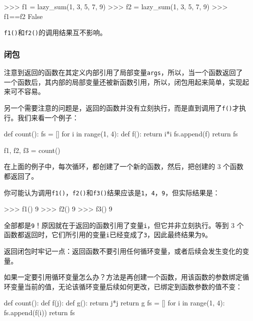 \begin{pythoncode}
>>> f1 = lazy_sum(1, 3, 5, 7, 9)
>>> f2 = lazy_sum(1, 3, 5, 7, 9)
>>> f1==f2
False
\end{pythoncode}

\texttt{f1()}和\texttt{f2()}的调用结果互不影响。

\hypertarget{ux95edux5305}{%
\subsubsection{闭包}\label{ux95edux5305}}

注意到返回的函数在其定义内部引用了局部变量\texttt{args}，所以，当一个函数返回了一个函数后，其内部的局部变量还被新函数引用，所以，闭包用起来简单，实现起来可不容易。

另一个需要注意的问题是，返回的函数并没有立刻执行，而是直到调用了\texttt{f()}才执行。我们来看一个例子：

\begin{pythoncode}
def count():
    fs = []
    for i in range(1, 4):
        def f():
             return i*i
        fs.append(f)
    return fs

f1, f2, f3 = count()
\end{pythoncode}

在上面的例子中，每次循环，都创建了一个新的函数，然后，把创建的 3
个函数都返回了。

你可能认为调用\texttt{f1()}，\texttt{f2()}和\texttt{f3()}结果应该是\texttt{1}，\texttt{4}，\texttt{9}，但实际结果是：

\begin{pythoncode}
>>> f1()
9
>>> f2()
9
>>> f3()
9
\end{pythoncode}

全部都是\texttt{9}！原因就在于返回的函数引用了变量\texttt{i}，但它并非立刻执行。等到
3
个函数都返回时，它们所引用的变量\texttt{i}已经变成了\texttt{3}，因此最终结果为\texttt{9}。

返回闭包时牢记一点：返回函数不要引用任何循环变量，或者后续会发生变化的变量。

如果一定要引用循环变量怎么办？方法是再创建一个函数，用该函数的参数绑定循环变量当前的值，无论该循环变量后续如何更改，已绑定到函数参数的值不变：

\begin{pythoncode}
def count():
    def f(j):
        def g():
            return j*j
        return g
    fs = []
    for i in range(1, 4):
        fs.append(f(i)) 
    return fs
\end{pythoncode}

